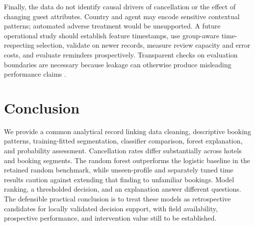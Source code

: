 Finally, the data do not identify causal drivers of cancellation or the effect of changing guest attributes. Country and agent may encode sensitive contextual patterns; automated adverse treatment would be unsupported. A future operational study should establish feature timestamps, use group-aware time-respecting selection, validate on newer records, measure review capacity and error costs, and evaluate reminders prospectively. Transparent checks on evaluation boundaries are necessary because leakage can otherwise produce misleading performance claims \citep{kapoor2023}.

\section{Conclusion}
We provide a common analytical record linking data cleaning, descriptive booking patterns, training-fitted segmentation, classifier comparison, forest explanation, and probability assessment. Cancellation rates differ substantially across hotels and booking segments. The random forest outperforms the logistic baseline in the retained random benchmark, while unseen-profile and separately tuned time results caution against extending that finding to unfamiliar bookings. Model ranking, a thresholded decision, and an explanation answer different questions. The defensible practical conclusion is to treat these models as retrospective candidates for locally validated decision support, with field availability, prospective performance, and intervention value still to be established.
